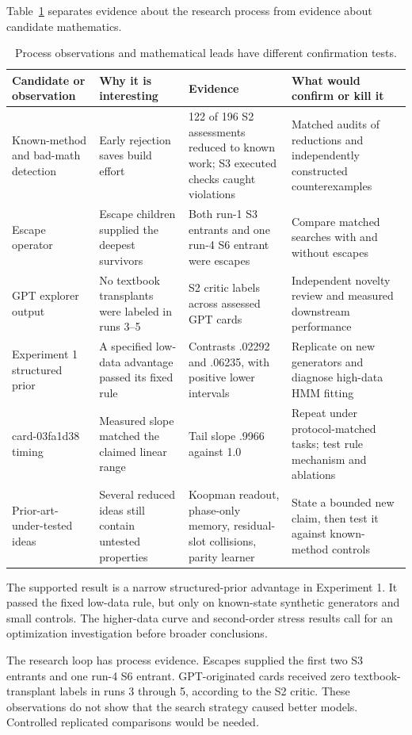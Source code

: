 Table~\ref{tab:promising} separates evidence about the research process from evidence about candidate mathematics.
\begin{table}[ht]
\centering\scriptsize
\caption{Process observations and mathematical leads have different confirmation tests.}
\label{tab:promising}
\begin{tabular}{p{2.7cm}p{3.1cm}p{4cm}p{4cm}}
\toprule Candidate or observation & Why it is interesting & Evidence & What would confirm or kill it \\
\midrule
Known-method and bad-math detection & Early rejection saves build effort & 122 of 196 S2 assessments reduced to known work; S3 executed checks caught violations & Matched audits of reductions and independently constructed counterexamples \\
Escape operator & Escape children supplied the deepest survivors & Both run-1 S3 entrants and one run-4 S6 entrant were escapes & Compare matched searches with and without escapes \\
GPT explorer output & No textbook transplants were labeled in runs 3--5 & S2 critic labels across assessed GPT cards & Independent novelty review and measured downstream performance \\
Experiment 1 structured prior & A specified low-data advantage passed its fixed rule & Contrasts .02292 and .06235, with positive lower intervals & Replicate on new generators and diagnose high-data HMM fitting \\
card-03fa1d38 timing & Measured slope matched the claimed linear range & Tail slope .9966 against 1.0 & Repeat under protocol-matched tasks; test rule mechanism and ablations \\
Prior-art-under-tested ideas & Several reduced ideas still contain untested properties & Koopman readout, phase-only memory, residual-slot collisions, parity learner & State a bounded new claim, then test it against known-method controls \\
\bottomrule
\end{tabular}
\end{table}

The supported result is a narrow structured-prior advantage in Experiment 1. It passed the fixed low-data rule, but only on known-state synthetic generators and small controls. The higher-data curve and second-order stress results call for an optimization investigation before broader conclusions.

The research loop has process evidence. Escapes supplied the first two S3 entrants and one run-4 S6 entrant. GPT-originated cards received zero textbook-transplant labels in runs 3 through 5, according to the S2 critic. These observations do not show that the search strategy caused better models. Controlled replicated comparisons would be needed.

